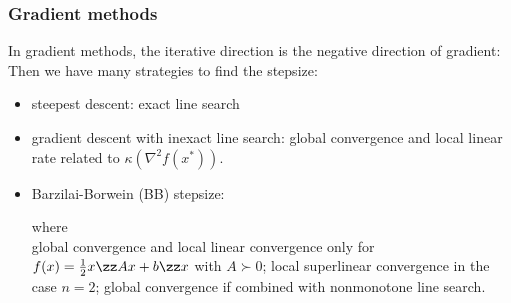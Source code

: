 	\subsubsection{Gradient methods}
	In gradient methods, the iterative direction is the negative direction of gradient:
	Then we have many strategies to find the stepsize:
	\begin{itemize}
		\item steepest descent: exact line search
		\item gradient descent with inexact line search:
		global convergence and local linear rate related
		to $\kappa(\nabla^2 f(x^*))$.\\[1mm]
		\item Barzilai-Borwein (BB) stepsize:
		\vspace{-3mm}
		
		where \\[1mm]
		
		 global convergence and local linear convergence only
		for $f(x)=\frac{1}{2}x\zz Ax +b\zz x$ with $A\succ 0$; local superlinear convergence
		in the case $n=2$; global convergence if combined with nonmonotone line search.
	\end{itemize}


